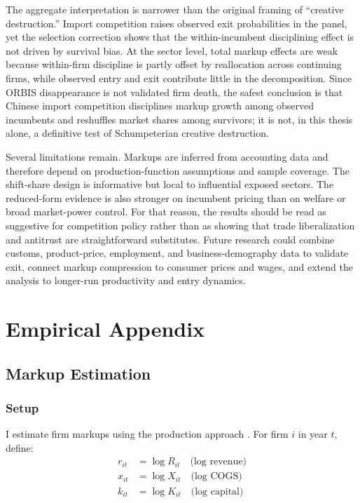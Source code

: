 \documentclass[12pt]{article}
\begin{document}
The aggregate interpretation is narrower than the original framing of ``creative destruction.'' Import competition raises observed exit probabilities in the panel, yet the selection correction shows that the within-incumbent disciplining effect is not driven by survival bias. At the sector level, total markup effects are weak because within-firm discipline is partly offset by reallocation across continuing firms, while observed entry and exit contribute little in the decomposition. Since ORBIS disappearance is not validated firm death, the safest conclusion is that Chinese import competition disciplines markup growth among observed incumbents and reshuffles market shares among survivors; it is not, in this thesis alone, a definitive test of Schumpeterian creative destruction.

Several limitations remain. Markups are inferred from accounting data and therefore depend on production-function assumptions and sample coverage. The shift-share design is informative but local to influential exposed sectors. The reduced-form evidence is also stronger on incumbent pricing than on welfare or broad market-power control. For that reason, the results should be read as suggestive for competition policy rather than as showing that trade liberalization and antitrust are straightforward substitutes. Future research could combine customs, product-price, employment, and business-demography data to validate exit, connect markup compression to consumer prices and wages, and extend the analysis to longer-run productivity and entry dynamics.

\pagebreak

\printbibliography

\pagebreak

\appendix

\section{Empirical Appendix}

\subsection{Markup Estimation}

\subsubsection{Setup}

I estimate firm markups using the production approach \parencite{deridderHitchhikersGuideMarkup2026,deloeckerMarkupsFirmLevelExport2012}. For firm $i$ in year $t$, define:
\begin{align*}
r_{it} &= \log R_{it} \quad \text{(log revenue)} \\
x_{it} &= \log X_{it} \quad \text{(log COGS)} \\
k_{it} &= \log K_{it} \quad \text{(log capital)}
\end{align*}
\end{document}
